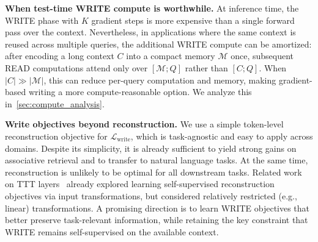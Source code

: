\documentclass{article}
\theoremstyle{plain}
\theoremstyle{definition}
\theoremstyle{remark}
\begin{document}
{\textbf{When test-time WRITE compute is worthwhile.}
At inference time, the WRITE phase with $K$ gradient steps is more expensive than a single forward pass over the context.
Nevertheless, in applications where the same context is reused across multiple queries, the additional WRITE compute can be amortized: after encoding a long context $C$ into a compact memory $\mathcal{M}$ once, subsequent READ computations attend only over $[\mathcal{M};Q]$ rather than $[C;Q]$. When $|C| \gg |\mathcal{M}|$, this can reduce per-query computation and memory, making gradient-based writing a more compute-reasonable option. We analyze this in~\cref{sec:compute_analysis}.





\textbf{Write objectives beyond reconstruction.}
We use a simple token-level reconstruction objective for $\mathcal{L}_{\text{write}}$, which is task-agnostic and easy to apply across domains.
Despite its simplicity, it is already sufficient to yield strong gains on associative retrieval and to transfer to natural language tasks.
At the same time, reconstruction is unlikely to be optimal for all downstream tasks.
Related work on TTT layers~\citep{sun2025l2l} already explored learning self-supervised reconstruction objectives via input transformations, but considered relatively restricted (e.g., linear) transformations.
A promising direction is to learn WRITE objectives that better preserve task-relevant information, while retaining the key constraint that WRITE remains self-supervised on the available context.


}
\end{document}
